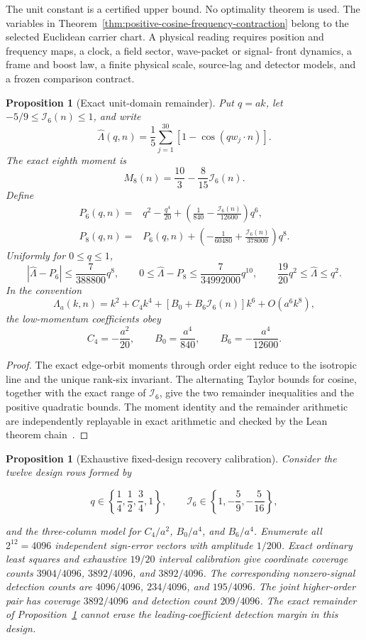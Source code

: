 \documentclass[11pt]{article}
\newtheorem{proposition}[theorem]{Proposition}
\theoremstyle{remark}
\theoremstyle{plain}
\begin{document}
The unit constant is a certified upper bound. No optimality theorem is used.
The variables in Theorem~\ref{thm:positive-cosine-frequency-contraction}
belong to the selected Euclidean carrier chart. A physical reading requires
position and frequency maps, a clock, a field sector, wave-packet or signal-
front dynamics, a frame and boost law, a finite physical scale, source-lag
and detector models, and a frozen comparison contract.

\begin{proposition}[Exact unit-domain remainder]
\label{prop:seam-current-unit-remainder}
Put \(q=ak\), let \(-5/9\le\mathcal I_6(n)\le1\), and write
\[
\widehat\Lambda(q,n)=\frac15\sum_{j=1}^{30}
  [1-\cos(qw_j\mathbin{\cdot}n)].
\]
The exact eighth moment is
\[
M_8(n)=\frac{10}{3}-\frac{8}{15}\mathcal I_6(n).
\]
Define
\begin{align*}
P_6(q,n)={}&q^2-\frac{q^4}{20}
 +\left(\frac1{840}-\frac{\mathcal I_6(n)}{12600}\right)q^6,\\
P_8(q,n)={}&P_6(q,n)+\left(-\frac1{60480}
 +\frac{\mathcal I_6(n)}{378000}\right)q^8.
\end{align*}
Uniformly for \(0\le q\le1\),
\[
|\widehat\Lambda-P_6|\le\frac7{388800}q^8,
\qquad
0\le\widehat\Lambda-P_8\le\frac7{34992000}q^{10},
\qquad
\frac{19}{20}q^2\le\widehat\Lambda\le q^2.
\]
In the convention
\[
\Lambda_a(k,n)=k^2+C_4k^4+
  [B_0+B_6\mathcal I_6(n)]k^6+O(a^6k^8),
\]
the low-momentum coefficients obey
\[
C_4=-\frac{a^2}{20},\qquad
B_0=\frac{a^4}{840},\qquad
B_6=-\frac{a^4}{12600}.
\]
\end{proposition}

\begin{proof}
The exact edge-orbit moments through order eight reduce to the isotropic line
and the unique rank-six invariant. The alternating Taylor bounds for cosine,
together with the exact range of \(\mathcal I_6\), give the two remainder
inequalities and the positive quadratic bounds. The moment identity and the
remainder arithmetic are independently replayable in exact arithmetic and
checked by the Lean theorem chain~\cite{ophrepo}.
\end{proof}

\begin{proposition}[Exhaustive fixed-design recovery calibration]
\label{prop:seam-current-synthetic-recovery}
Consider the twelve design rows formed by

\[
q\in\left\{\frac14,\frac12,\frac34,1\right\},
\qquad
\mathcal I_6\in\left\{1,-\frac59,-\frac5{16}\right\},
\]

and the three-column model for \(C_4/a^2\), \(B_0/a^4\), and \(B_6/a^4\).
Enumerate all \(2^{12}=4096\) independent sign-error vectors with amplitude
\(1/200\). Exact ordinary least squares and exhaustive \(19/20\) interval
calibration give coordinate coverage counts \(3904/4096\), \(3892/4096\),
and \(3892/4096\). The corresponding nonzero-signal detection counts are
\(4096/4096\), \(234/4096\), and \(195/4096\). The joint higher-order pair has
coverage \(3892/4096\) and detection count \(209/4096\). The exact remainder
of Proposition~\ref{prop:seam-current-unit-remainder} cannot erase the
leading-coefficient detection margin in this design.
\end{proposition}
\end{document}
